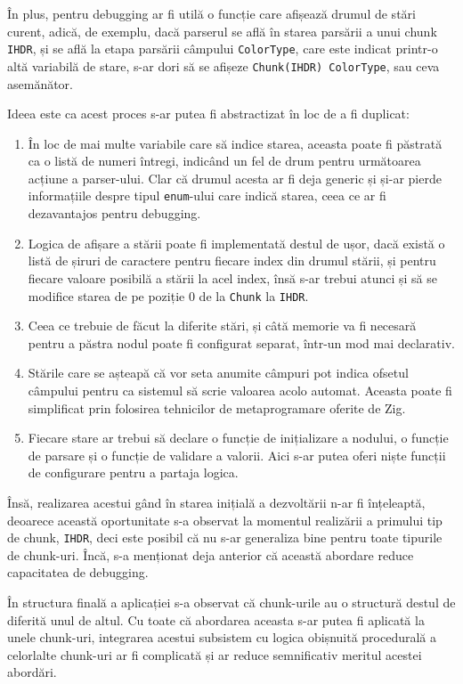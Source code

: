 \documentclass[a4paper,12pt]{report}
\begin{document}
În plus, pentru debugging ar fi utilă o funcție care afișează drumul de stări curent,
adică, de exemplu, dacă parserul se află în starea parsării a unui chunk \texttt{IHDR}, 
și se află la etapa parsării câmpului \texttt{ColorType},
care este indicat printr-o altă variabilă de stare,
s-ar dori să se afișeze \texttt{Chunk(IHDR) ColorType}, sau ceva asemănător.

Ideea este ca acest proces s-ar putea fi abstractizat în loc de a fi duplicat:
\begin{enumerate}
\item
    În loc de mai multe variabile care să indice starea, aceasta poate fi păstrată ca
    o listă de numeri întregi, indicând un fel de drum pentru următoarea acțiune a parser-ului.
    Clar că drumul acesta ar fi deja generic și și-ar pierde informațiile despre tipul
    \texttt{enum}-ului care indică starea, ceea ce ar fi dezavantajos pentru debugging.
\item
    Logica de afișare a stării poate fi implementată destul de ușor, dacă există o listă de
    șiruri de caractere pentru fiecare index din drumul stării,
    și pentru fiecare valoare posibilă a stării la acel index,
    însă s-ar trebui atunci și să se modifice starea
    de pe poziție 0 de la \texttt{Chunk} la \texttt{IHDR}.
\item
    Ceea ce trebuie de făcut la diferite stări,
    și câtă memorie va fi necesară pentru a păstra nodul poate fi configurat separat,
    într-un mod mai declarativ.
\item
    Stările care se așteapă că vor seta anumite câmpuri
    pot indica ofsetul câmpului pentru ca sistemul să scrie valoarea acolo automat.
    Aceasta poate fi simplificat prin folosirea tehnicilor de metaprogramare oferite de Zig.
\item
    Fiecare stare ar trebui să declare o funcție de inițializare a nodului,
    o funcție de parsare și o funcție de validare a valorii.
    Aici s-ar putea oferi niște funcții de configurare pentru a partaja logica.
\end{enumerate}

Însă, realizarea acestui gând în starea inițială a dezvoltării n-ar fi înțeleaptă,
deoarece această oportunitate s-a observat la momentul
realizării a primului tip de chunk, \texttt{IHDR},
deci este posibil că nu s-ar generaliza bine pentru toate tipurile de chunk-uri.
Încă, s-a menționat deja anterior că această abordare reduce capacitatea de debugging.

În structura finală a aplicației s-a observat că chunk-urile au o structură destul de diferită unul de altul.
Cu toate că abordarea aceasta s-ar putea fi aplicată la unele chunk-uri,
integrarea acestui subsistem cu logica obișnuită procedurală a celorlalte chunk-uri
ar fi complicată și ar reduce semnificativ meritul acestei abordări. 
\end{document}
